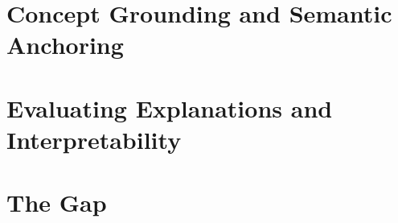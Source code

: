 \section{Concept Grounding and Semantic Anchoring}
\label{sec:rw-concepts}

\section{Evaluating Explanations and Interpretability}
\label{sec:rw-eval-explanations}

\section{The Gap}
\label{sec:rw-gap}
